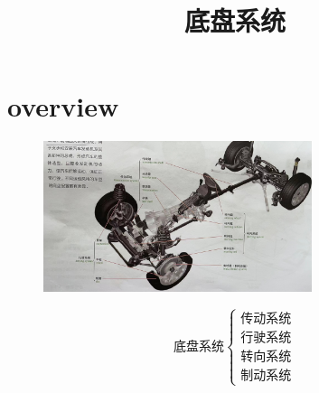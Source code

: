 
\graphicspath{{../img/}}
\title{底盘系统}
\author{}
\date{}
\usepackage{extarrows}

\setlength{\parskip}{0em}	%
\setlength{\parindent}{2em} %
\setlength{\baselineskip}{20pt}	%
\selectfont	%
\setlength{\lineskip}{10pt}		%
\setlength{\lineskiplimit}{10pt}	%
\abovedisplayshortskip=0pt	%
\belowdisplayshortskip=0pt
\abovedisplayskip=0pt	%
\belowdisplayskip=0pt
\renewcommand{\arraystretch}{1.5}
\maketitle

\section{overview}
	\vspace{-1.8em}
	\begin{figure}
		\centering
		\includegraphics[width=0.7\textwidth]{3-1}
	\end{figure}
	\begin{equation*}
		\text{底盘系统}\begin{cases}
			\text{传动系统} \\
			\text{行驶系统} \\
			\text{转向系统} \\
			\text{制动系统}
		\end{cases}
	\end{equation*}
\vspace{6em}
